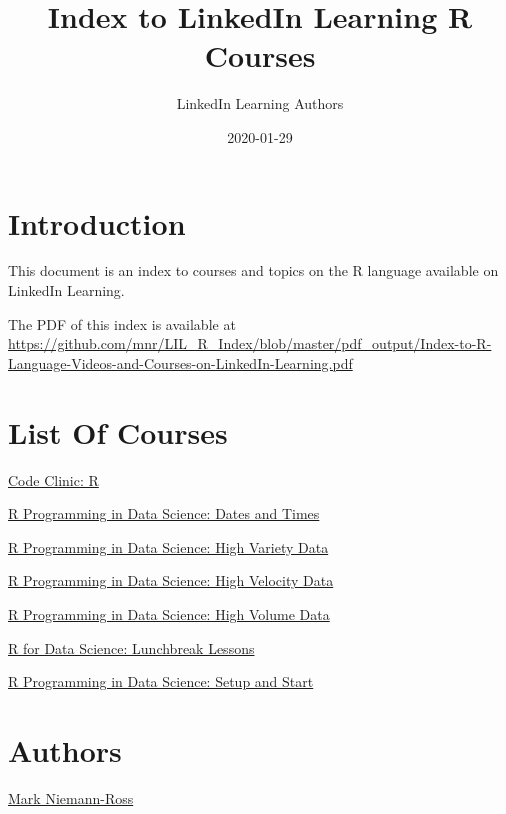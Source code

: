 \documentclass[]{book}
\title{Index to LinkedIn Learning R Courses}
\author{LinkedIn Learning Authors}
\date{2020-01-29}
\begin{document}
\maketitle

{
\setcounter{tocdepth}{1}
\tableofcontents
}
\hypertarget{introduction}{%
\chapter*{Introduction}\label{introduction}}

This document is an index to courses and topics on the R language available on LinkedIn Learning.

The PDF of this index is available at \url{https://github.com/mnr/LIL_R_Index/blob/master/pdf_output/Index-to-R-Language-Videos-and-Courses-on-LinkedIn-Learning.pdf}

\hypertarget{list-of-courses}{%
\chapter*{List Of Courses}\label{list-of-courses}}

\href{https://linkedin-learning.pxf.io/codeclinic_R}{Code Clinic: R}

\href{https://linkedin-learning.pxf.io/r_dates}{R Programming in Data Science: Dates and Times}

\href{https://linkedin-learning.pxf.io/r_highvariety}{R Programming in Data Science: High Variety Data}

\href{https://linkedin-learning.pxf.io/r_highvelocity}{R Programming in Data Science: High Velocity Data}

\href{https://linkedin-learning.pxf.io/r_highvolume}{R Programming in Data Science: High Volume Data}

\href{https://linkedin-learning.pxf.io/r_lunchbreak}{R for Data Science: Lunchbreak Lessons}

\href{https://linkedin-learning.pxf.io/setupstart}{R Programming in Data Science: Setup and Start}

\hypertarget{authors}{%
\chapter*{Authors}\label{authors}}

\href{https://www.linkedin.com/in/markniemannross/}{Mark Niemann-Ross}
\end{document}
